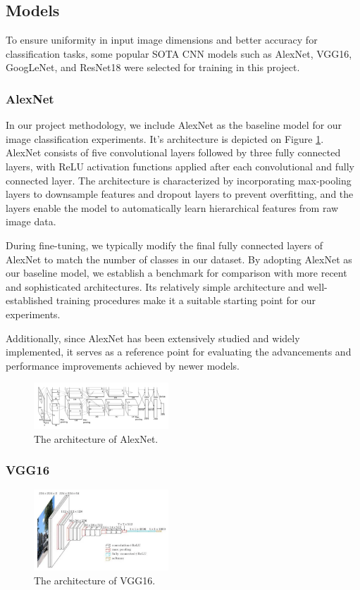 \documentclass[final,5p,times,twocolumn,sort&compress]{elsarticle}
\begin{document}
\subsection{Models}
To ensure uniformity in input image dimensions and better accuracy for classification tasks, some popular SOTA CNN models such as AlexNet, VGG16, GoogLeNet, and ResNet18 were selected for training in this project.

\subsubsection{AlexNet}
In our project methodology, we include AlexNet \cite{NIPS2012_c399862d} as the baseline model for our image classification experiments. It's architecture is depicted on Figure \ref{fig:AlexNet_arch}. AlexNet consists of five convolutional layers followed by three fully connected layers, with ReLU activation functions applied after each convolutional and fully connected layer. The architecture is characterized by incorporating max-pooling layers to downsample features and dropout layers to prevent overfitting, and the layers enable the model to automatically learn hierarchical features from raw image data.

During fine-tuning, we typically modify the final fully connected layers of AlexNet to match the number of classes in our dataset. By adopting AlexNet as our baseline model, we establish a benchmark for comparison with more recent and sophisticated architectures. Its relatively simple architecture and well-established training procedures make it a suitable starting point for our experiments.

Additionally, since AlexNet has been extensively studied and widely implemented, it serves as a reference point for evaluating the advancements and performance improvements achieved by newer models.

\begin{figure}[H]
    \centering
    \includegraphics[width=0.45\textwidth]{./img/alexnet.png}
    \caption{The architecture of AlexNet.}
    \label{fig:AlexNet_arch}
\end{figure}

\subsubsection{VGG16}
\begin{figure}[H]
    \centering
    \includegraphics[width=0.45\textwidth]{./img/VGG_arch.jpg}
    \caption{The architecture of VGG16.}
    \label{fig:VGG16_arch}
\end{figure}
\end{document}
